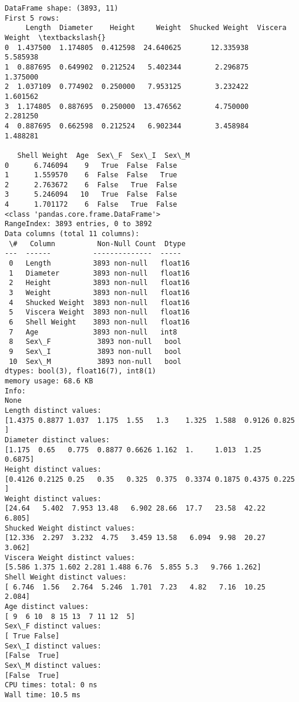 \documentclass[11pt]{article}
\begin{document}
    \begin{Verbatim}[commandchars=\\\{\}]
DataFrame shape: (3893, 11)
First 5 rows:
     Length  Diameter    Height     Weight  Shucked Weight  Viscera Weight  \textbackslash{}
0  1.437500  1.174805  0.412598  24.640625       12.335938        5.585938
1  0.887695  0.649902  0.212524   5.402344        2.296875        1.375000
2  1.037109  0.774902  0.250000   7.953125        3.232422        1.601562
3  1.174805  0.887695  0.250000  13.476562        4.750000        2.281250
4  0.887695  0.662598  0.212524   6.902344        3.458984        1.488281

   Shell Weight  Age  Sex\_F  Sex\_I  Sex\_M
0      6.746094    9   True  False  False
1      1.559570    6  False  False   True
2      2.763672    6  False   True  False
3      5.246094   10   True  False  False
4      1.701172    6  False   True  False
<class 'pandas.core.frame.DataFrame'>
RangeIndex: 3893 entries, 0 to 3892
Data columns (total 11 columns):
 \#   Column          Non-Null Count  Dtype
---  ------          --------------  -----
 0   Length          3893 non-null   float16
 1   Diameter        3893 non-null   float16
 2   Height          3893 non-null   float16
 3   Weight          3893 non-null   float16
 4   Shucked Weight  3893 non-null   float16
 5   Viscera Weight  3893 non-null   float16
 6   Shell Weight    3893 non-null   float16
 7   Age             3893 non-null   int8
 8   Sex\_F           3893 non-null   bool
 9   Sex\_I           3893 non-null   bool
 10  Sex\_M           3893 non-null   bool
dtypes: bool(3), float16(7), int8(1)
memory usage: 68.6 KB
Info:
None
Length distinct values:
[1.4375 0.8877 1.037  1.175  1.55   1.3    1.325  1.588  0.9126 0.825 ]
Diameter distinct values:
[1.175  0.65   0.775  0.8877 0.6626 1.162  1.     1.013  1.25   0.6875]
Height distinct values:
[0.4126 0.2125 0.25   0.35   0.325  0.375  0.3374 0.1875 0.4375 0.225 ]
Weight distinct values:
[24.64   5.402  7.953 13.48   6.902 28.66  17.7   23.58  42.22   6.805]
Shucked Weight distinct values:
[12.336  2.297  3.232  4.75   3.459 13.58   6.094  9.98  20.27   3.062]
Viscera Weight distinct values:
[5.586 1.375 1.602 2.281 1.488 6.76  5.855 5.3   9.766 1.262]
Shell Weight distinct values:
[ 6.746  1.56   2.764  5.246  1.701  7.23   4.82   7.16  10.25   2.084]
Age distinct values:
[ 9  6 10  8 15 13  7 11 12  5]
Sex\_F distinct values:
[ True False]
Sex\_I distinct values:
[False  True]
Sex\_M distinct values:
[False  True]
CPU times: total: 0 ns
Wall time: 10.5 ms
    \end{Verbatim}
\end{document}
